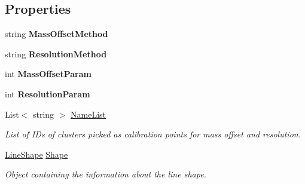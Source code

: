 \subsection*{Properties}
\begin{DoxyCompactItemize}
\item 
\mbox{\label{class_isotope_fit_1_1_i_f_data_1_1_calibration_a3fd5fabda47ec06b75abe741a959a640}} 
string {\bfseries Mass\+Offset\+Method}
\item 
\mbox{\label{class_isotope_fit_1_1_i_f_data_1_1_calibration_a1d0576963ddb1bd5dee63fe05ee2ba88}} 
string {\bfseries Resolution\+Method}
\item 
\mbox{\label{class_isotope_fit_1_1_i_f_data_1_1_calibration_a43c6a104771e41ef627ffbeefc745ad3}} 
int {\bfseries Mass\+Offset\+Param}
\item 
\mbox{\label{class_isotope_fit_1_1_i_f_data_1_1_calibration_ac215515a411ade3f25b2828589ca32d7}} 
int {\bfseries Resolution\+Param}
\item 
List$<$ string $>$ \hyperlink{class_isotope_fit_1_1_i_f_data_1_1_calibration_a2e347f087df878f22010302bda7db4be}{Name\+List}
\begin{DoxyCompactList}\small\item\em List of I\+Ds of clusters picked as calibration points for mass offset and resolution. \end{DoxyCompactList}\item 
\hyperlink{class_isotope_fit_1_1_i_f_data_1_1_calibration_1_1_line_shape}{Line\+Shape} \hyperlink{class_isotope_fit_1_1_i_f_data_1_1_calibration_ad0c3e0969448ad0cc57307c77c2222eb}{Shape}
\begin{DoxyCompactList}\small\item\em Object containing the information about the line shape. \end{DoxyCompactList}\item 

\end{DoxyCompactItemize}
